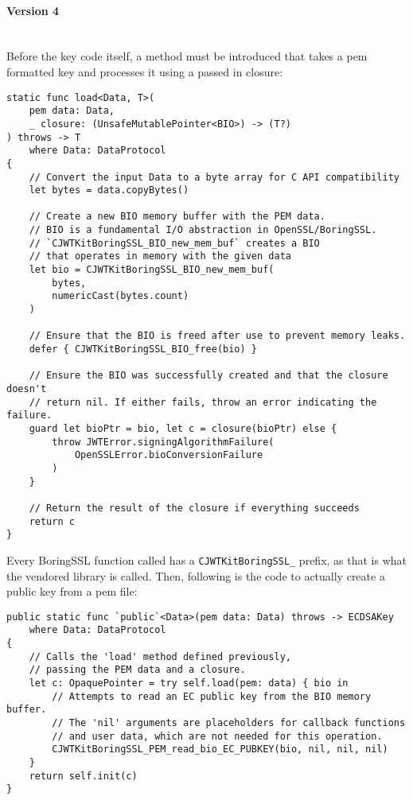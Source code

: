 \paragraph{Version 4} \mbox{} \\
Before the key code itself, a method must be introduced that takes a \gls{pem} formatted key and processes it using a passed in closure:
\begin{verbatim}
static func load<Data, T>(
    pem data: Data, 
    _ closure: (UnsafeMutablePointer<BIO>) -> (T?)
) throws -> T
    where Data: DataProtocol
{
    // Convert the input Data to a byte array for C API compatibility
    let bytes = data.copyBytes()

    // Create a new BIO memory buffer with the PEM data.
    // BIO is a fundamental I/O abstraction in OpenSSL/BoringSSL.
    // `CJWTKitBoringSSL_BIO_new_mem_buf` creates a BIO 
    // that operates in memory with the given data
    let bio = CJWTKitBoringSSL_BIO_new_mem_buf(
        bytes, 
        numericCast(bytes.count)
    )

    // Ensure that the BIO is freed after use to prevent memory leaks.
    defer { CJWTKitBoringSSL_BIO_free(bio) }
    
    // Ensure the BIO was successfully created and that the closure doesn't 
    // return nil. If either fails, throw an error indicating the failure.
    guard let bioPtr = bio, let c = closure(bioPtr) else {
        throw JWTError.signingAlgorithmFailure(
            OpenSSLError.bioConversionFailure
        )
    }

    // Return the result of the closure if everything succeeds
    return c
}
\end{verbatim}
Every BoringSSL function called has a \lstinline{CJWTKitBoringSSL_} prefix, as that is what the vendored library is called.
Then, following is the code to actually create a public key from a \gls{pem} file:
\begin{verbatim}
public static func `public`<Data>(pem data: Data) throws -> ECDSAKey
    where Data: DataProtocol
{
    // Calls the 'load' method defined previously, 
    // passing the PEM data and a closure.
    let c: OpaquePointer = try self.load(pem: data) { bio in
        // Attempts to read an EC public key from the BIO memory buffer.
        // The 'nil' arguments are placeholders for callback functions
        // and user data, which are not needed for this operation.
        CJWTKitBoringSSL_PEM_read_bio_EC_PUBKEY(bio, nil, nil, nil)
    }
    return self.init(c)
}
\end{verbatim}
